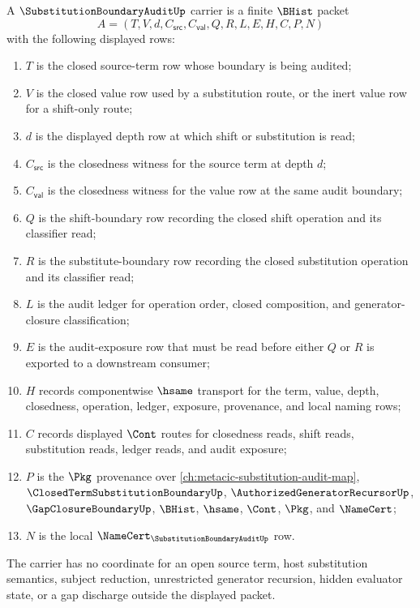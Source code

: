 \begin{definition}
\label{def:substitution-boundary-audit-carrier}
A $\SubstitutionBoundaryAuditUp$ carrier is a finite $\BHist$ packet
$$
A=(T,V,d,C_{\mathsf{src}},C_{\mathsf{val}},Q,R,L,E,H,C,P,N)
$$
with the following displayed rows:
\begin{enumerate}
\item $T$ is the closed source-term row whose boundary is being audited;
\item $V$ is the closed value row used by a substitution route, or the inert value row for a shift-only route;
\item $d$ is the displayed depth row at which shift or substitution is read;
\item $C_{\mathsf{src}}$ is the closedness witness for the source term at depth $d$;
\item $C_{\mathsf{val}}$ is the closedness witness for the value row at the same audit boundary;
\item $Q$ is the shift-boundary row recording the closed shift operation and its classifier read;
\item $R$ is the substitute-boundary row recording the closed substitution operation and its classifier read;
\item $L$ is the audit ledger for operation order, closed composition, and generator-closure classification;
\item $E$ is the audit-exposure row that must be read before either $Q$ or $R$ is exported to a downstream consumer;
\item $H$ records componentwise $\hsame$ transport for the term, value, depth, closedness, operation, ledger, exposure, provenance, and local naming rows;
\item $C$ records displayed $\Cont$ routes for closedness reads, shift reads, substitution reads, ledger reads, and audit exposure;
\item $P$ is the $\Pkg$ provenance over \autoref{ch:metacic-substitution-audit-map}, $\ClosedTermSubstitutionBoundaryUp$, $\AuthorizedGeneratorRecursorUp$, $\GapClosureBoundaryUp$, $\BHist$, $\hsame$, $\Cont$, $\Pkg$, and $\NameCert$;
\item $N$ is the local $\NameCert_{\SubstitutionBoundaryAuditUp}$ row.
\end{enumerate}
The carrier has no coordinate for an open source term, host substitution semantics, subject reduction, unrestricted generator recursion, hidden evaluator state, or a gap discharge outside the displayed packet.
\end{definition}

